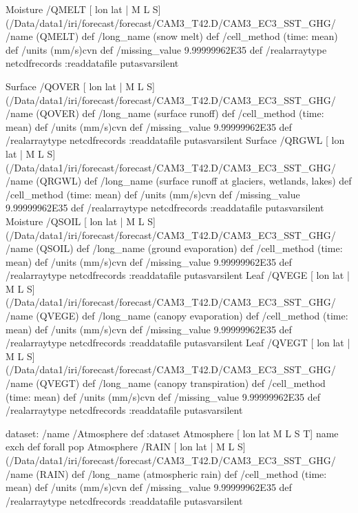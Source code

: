 \begin{ingrid}
Moisture /QMELT{
[ lon lat | M L S] (/Data/data1/iri/forecast/forecast/CAM3_T42.D/CAM3_EC3_SST_GHG/%
/name (QMELT) def
 /long_name (snow melt) def
 /cell_method (time: mean) def
 /units (mm/s)cvn def
 /missing_value 9.99999962E35 def
 /realarraytype netcdfrecords :readdatafile
}putasvarsilent

Surface /QOVER{
[ lon lat | M L S] (/Data/data1/iri/forecast/forecast/CAM3_T42.D/CAM3_EC3_SST_GHG/%
/name (QOVER) def
 /long_name (surface runoff) def
 /cell_method (time: mean) def
 /units (mm/s)cvn def
 /missing_value 9.99999962E35 def
 /realarraytype netcdfrecords :readdatafile
}putasvarsilent
Surface /QRGWL{
[ lon lat | M L S] (/Data/data1/iri/forecast/forecast/CAM3_T42.D/CAM3_EC3_SST_GHG/%
/name (QRGWL) def
 /long_name (surface runoff at glaciers, wetlands, lakes) def
 /cell_method (time: mean) def
 /units (mm/s)cvn def
 /missing_value 9.99999962E35 def
 /realarraytype netcdfrecords :readdatafile
}putasvarsilent
Moisture /QSOIL{
[ lon lat | M L S] (/Data/data1/iri/forecast/forecast/CAM3_T42.D/CAM3_EC3_SST_GHG/%
/name (QSOIL) def
 /long_name (ground evaporation) def
 /cell_method (time: mean) def
 /units (mm/s)cvn def
 /missing_value 9.99999962E35 def
 /realarraytype netcdfrecords :readdatafile
}putasvarsilent
Leaf /QVEGE{
[ lon lat | M L S] (/Data/data1/iri/forecast/forecast/CAM3_T42.D/CAM3_EC3_SST_GHG/%
/name (QVEGE) def
 /long_name (canopy evaporation) def
 /cell_method (time: mean) def
 /units (mm/s)cvn def
 /missing_value 9.99999962E35 def
 /realarraytype netcdfrecords :readdatafile
}putasvarsilent
Leaf /QVEGT{
[ lon lat | M L S] (/Data/data1/iri/forecast/forecast/CAM3_T42.D/CAM3_EC3_SST_GHG/%
/name (QVEGT) def
 /long_name (canopy transpiration) def
 /cell_method (time: mean) def
 /units (mm/s)cvn def
 /missing_value 9.99999962E35 def
 /realarraytype netcdfrecords :readdatafile
}putasvarsilent

dataset: /name /Atmosphere def :dataset
Atmosphere [ lon lat M L S T] {name exch def} forall pop
Atmosphere /RAIN{
[ lon lat | M L S] (/Data/data1/iri/forecast/forecast/CAM3_T42.D/CAM3_EC3_SST_GHG/%
/name (RAIN) def
 /long_name (atmospheric rain) def
 /cell_method (time: mean) def
 /units (mm/s)cvn def
 /missing_value 9.99999962E35 def
 /realarraytype netcdfrecords :readdatafile
}putasvarsilent


\end{ingrid}
